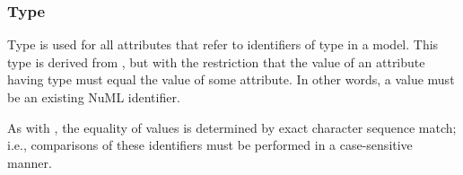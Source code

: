 \subsubsection[\element{NuMLSIdRef}]{Type }
\label{type:numlsidref}
Type  is used for all attributes that refer to identifiers of type \hyperref[type:numlsid]{} in a model. This type is derived from \hyperref[type:numlsid]{}, but with the restriction that the value of an attribute having type  must equal the value of some \hyperref[type:numlsid]{} attribute. In other words, a  value must be an existing NuML identifier.

As with \hyperref[type:numlsid]{}, the equality of  values is determined by exact character sequence match; i.e., comparisons of these identifiers must be performed in a case-sensitive manner.

